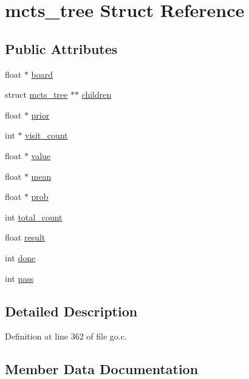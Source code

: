 \hypertarget{structmcts__tree}{}\section{mcts\+\_\+tree Struct Reference}
\label{structmcts__tree}
\subsection*{Public Attributes}
\begin{DoxyCompactItemize}
\item 
float $\ast$ \mbox{\hyperlink{structmcts__tree_a50487f8dd5a0c6a7990be619e76f5d0b}{board}}
\item 
struct \mbox{\hyperlink{structmcts__tree}{mcts\+\_\+tree}} $\ast$$\ast$ \mbox{\hyperlink{structmcts__tree_ac3116e318ed83f71180e428ba9f09ba5}{children}}
\item 
float $\ast$ \mbox{\hyperlink{structmcts__tree_aa05f18bb6c906a41a9bd35032f09d10f}{prior}}
\item 
int $\ast$ \mbox{\hyperlink{structmcts__tree_a9741f27a8cbb14c3c80fa893d07102ef}{visit\+\_\+count}}
\item 
float $\ast$ \mbox{\hyperlink{structmcts__tree_a4d2670aa15eb6c5e8fd5334e34bd3539}{value}}
\item 
float $\ast$ \mbox{\hyperlink{structmcts__tree_aaa243f2c96b587bd32b7376737289ba0}{mean}}
\item 
float $\ast$ \mbox{\hyperlink{structmcts__tree_ad285cf5c855a7322c9e92f8c193c553b}{prob}}
\item 
int \mbox{\hyperlink{structmcts__tree_a454a9de890a8bbe762b7ffd430e46927}{total\+\_\+count}}
\item 
float \mbox{\hyperlink{structmcts__tree_a28b1271b89ebe12d66448a5f07dd1b1e}{result}}
\item 
int \mbox{\hyperlink{structmcts__tree_adc0ebbeaa070a62f6530f1fe59c0a036}{done}}
\item 
int \mbox{\hyperlink{structmcts__tree_a3dec5169d2eb9976e7734d01fa61047a}{pass}}
\end{DoxyCompactItemize}


\subsection{Detailed Description}


Definition at line 362 of file go.\+c.



\subsection{Member Data Documentation}
\mbox{\label{structmcts__tree_a50487f8dd5a0c6a7990be619e76f5d0b}} 
